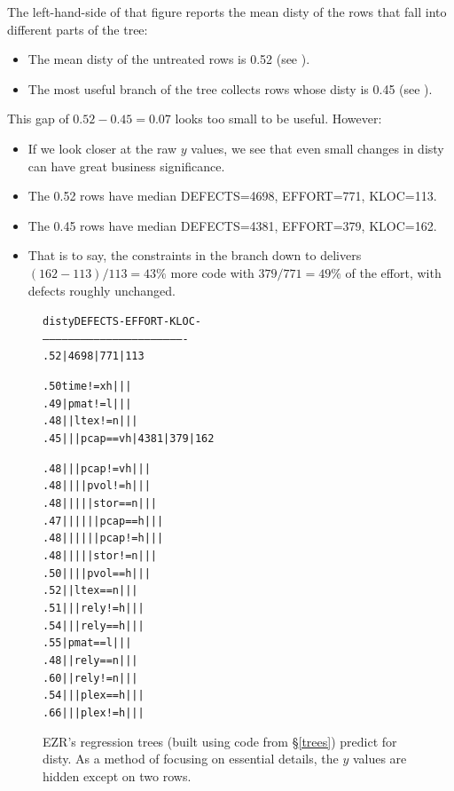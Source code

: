 \documentclass[AMA,STIX2COL]{WileyNJDv5}
\newcommand{\disc}[2][black]{%
  \tikz[baseline=(c.base)]%
    \node[circle, fill=#1, draw=#1,
          inner sep=0pt, minimum size=1.2ex,
          text=white, font=\tiny\bfseries]
    (c) {#2};%
}
\newcommand{\rc}[1]{%
  \iftoggle{rcred}{\disc[red]{#1}}{\disc[black]{#1}}%
}
\begin{document}
The left-hand-side of that figure
reports the mean \textsf{disty} of
the rows that fall into different  parts of the tree:
\begin{itemize}
\item
The mean \textsf{disty} of the
untreated rows is 0.52 (see \rc{1}). 
\item The most useful branch of the tree
collects rows whose \textsf{disty} is 0.45
(see \rc{2}).
\end{itemize}
This gap of $0.52-0.45 = 0.07$ looks too
small to be useful. However:
\begin{itemize}
\item
If we look closer at the raw $y$ values,
we see that   even small
changes in \textsf{disty}
can have great business significance.
\item
The
0.52 rows have median DEFECTS=4698, EFFORT=771, KLOC=113.
\item The
0.45 rows have median DEFECTS=4381, EFFORT=379, KLOC=162.
\item That is to say,
the constraints  in the branch down to 
\rc{2}  delivers $(162-113)/113 = 43\%$ more code with
$379/771 = 49\%$ of the effort, with defects roughly unchanged.
 \end{itemize}
\begin{figure}[!t]
{\fontsize{6pt}{7.2pt}\selectfont
\begin{alltt}
disty                                  DEFECTS-   EFFORT-   KLOC- 
-------------------------------------------------------------------
.52                                |    4698  |    771  |  113 \rc{1}
.50    time != xh                  |          |         |
.49    |  pmat != l                |          |         |
.48    |  |  ltex != n             |          |         |
.45    |  |  |  pcap == vh         |    4381  |    379  |  162 \rc{2}
.48    |  |  |  pcap != vh         |          |         |
.48    |  |  |  |  pvol != h       |          |         |
.48    |  |  |  |  |  stor == n    |          |         |
.47    |  |  |  |  |  |  pcap == h |          |         |
.48    |  |  |  |  |  |  pcap != h |          |         |
.48    |  |  |  |  |  stor != n    |          |         |
.50    |  |  |  |  pvol == h       |          |         |
.52    |  |  ltex == n             |          |         |
.51    |  |  |  rely != h          |          |         |
.54    |  |  |  rely == h          |          |         |
.55    |  pmat == l                |          |         |
.48    |  |  rely == n             |          |         |
.60    |  |  rely != n             |          |         |
.54    |  |  |  plex == h          |          |         |
.66    |  |  |  plex != h          |          |         |
\end{alltt}
}
\caption{EZR's regression trees (built using
code from \S\ref{trees}) predict for  \textsf{disty}.
As a method of focusing on essential details, the  $y$ values
are hidden except on two rows.}\label{htree}
\end{figure}
\end{document}
